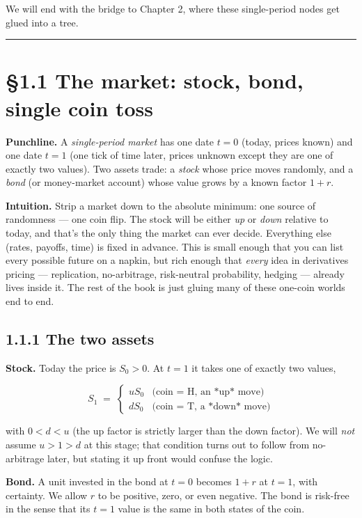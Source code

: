 \documentclass[
  10pt,
  twoside]{book}
\begin{document}
We will end with the bridge to Chapter 2, where these single-period
nodes get glued into a tree.

\begin{center}\rule{0.5\linewidth}{0.5pt}\end{center}

\section{§1.1 The market: stock, bond, single coin
toss}\label{the-market-stock-bond-single-coin-toss}

\textbf{Punchline.} A \emph{single-period market} has one date \(t=0\)
(today, prices known) and one date \(t=1\) (one tick of time later,
prices unknown except they are one of exactly two values). Two assets
trade: a \emph{stock} whose price moves randomly, and a \emph{bond} (or
money-market account) whose value grows by a known factor \(1+r\).

\textbf{Intuition.} Strip a market down to the absolute minimum: one
source of randomness --- one coin flip. The stock will be either
\emph{up} or \emph{down} relative to today, and that's the only thing
the market can ever decide. Everything else (rates, payoffs, time) is
fixed in advance. This is small enough that you can list every possible
future on a napkin, but rich enough that \emph{every} idea in
derivatives pricing --- replication, no-arbitrage, risk-neutral
probability, hedging --- already lives inside it. The rest of the book
is just gluing many of these one-coin worlds end to end.

\subsection{1.1.1 The two assets}\label{the-two-assets}

\textbf{Stock.} Today the price is \(S_0>0\). At \(t=1\) it takes one of
exactly two values,

\[S_1 \;=\; \begin{cases} uS_0 & \text{(coin = H, an *up* move)}\\ dS_0 & \text{(coin = T, a *down* move)}\end{cases}\]

with \(0<d<u\) (the up factor is strictly larger than the down factor).
We will \emph{not} assume \(u>1>d\) at this stage; that condition turns
out to follow from no-arbitrage later, but stating it up front would
confuse the logic.

\textbf{Bond.} A unit invested in the bond at \(t=0\) becomes \(1+r\) at
\(t=1\), with certainty. We allow \(r\) to be positive, zero, or even
negative. The bond is risk-free in the sense that its \(t=1\) value is
the same in both states of the coin.
\end{document}
